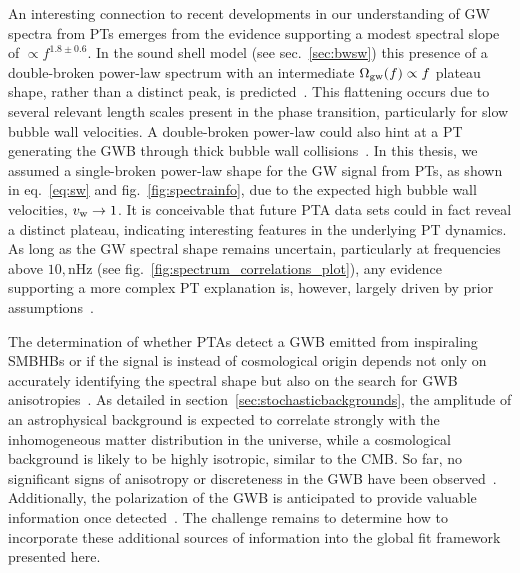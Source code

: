 An interesting connection to recent developments in our understanding of \ac{GW} spectra from \acp{PT} emerges from the evidence supporting a modest spectral slope of $\propto f^{1.8 \pm 0.6}$. In the sound shell model (see sec.~\ref{sec:bwsw}) this presence of a double-broken power-law spectrum with an intermediate $\Omega_{\text{gw}}(f) \propto f$ plateau shape, rather than a distinct peak, is predicted~\cite{Hindmarsh:2020hop, Giese:2020znk}. This flattening occurs due to several relevant  length scales present in the phase transition, particularly for slow bubble wall velocities. A double-broken power-law could also hint at a \ac{PT} generating the \ac{GWB} through thick bubble wall collisions~\cite{Winkler:2024olr, Konstandin:2017sat, Jinno:2017fby}. In this thesis, we assumed a single-broken power-law shape for the \ac{GW} signal from \acp{PT}, as shown in eq.~\eqref{eq:sw} and fig.~\ref{fig:spectrainfo}, due to the expected high bubble wall velocities, $v_\mathrm{w} \to 1$. It is conceivable that future \ac{PTA} data sets could in fact reveal a distinct plateau, indicating interesting features in the underlying \ac{PT} dynamics. As long as the \ac{GW} spectral shape remains uncertain, particularly at frequencies above $10 , \text{nHz}$ (see fig.~\ref{fig:spectrum_correlations_plot}), any evidence supporting a more complex \ac{PT} explanation is, however, largely driven by prior assumptions~\cite{Winkler:2024olr}.

The determination of whether \acp{PTA} detect a \ac{GWB} emitted from inspiraling \acp{SMBHB} or if the signal is instead of cosmological origin depends not only on accurately identifying the spectral shape but also on the search for \ac{GWB} anisotropies~\cite{Schulze:2023ich,LISACosmologyWorkingGroup:2022kbp,Taylor:2020zpk}. As detailed in section~\ref{sec:stochasticbackgrounds}, the amplitude  of an astrophysical background is expected to correlate strongly with the inhomogeneous matter distribution in the universe, while a cosmological background is likely to be highly isotropic, similar to the \ac{CMB}. So far, no significant signs of anisotropy or discreteness in the \ac{GWB} have been observed~\cite{NANOGrav:2023bts,IPTA:2023ero,Agazie:2024jbf, NANOGrav:2023pdq}. Additionally, the polarization of the \ac{GWB} is anticipated to provide valuable information once detected~\cite{Kato:2015bye, Conneely:2018wis, Hotinli:2019tpc, Belgacem:2020nda,Sato-Polito:2021efu,ValbusaDallArmi:2023ydl,Ellis:2023owy}. The challenge remains to determine how to incorporate these additional sources of information into the global fit framework presented here.

